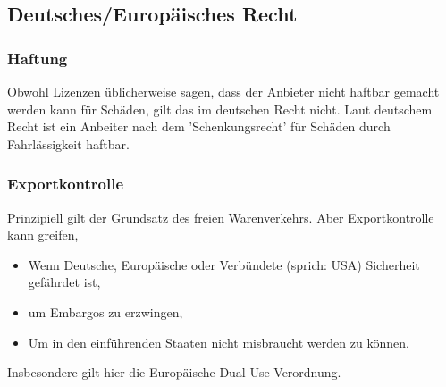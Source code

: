 \subsection{Deutsches/Europäisches Recht}

\subsubsection{Haftung}
Obwohl Lizenzen üblicherweise sagen, dass der Anbieter nicht haftbar gemacht werden kann für Schäden, gilt das im deutschen Recht nicht. Laut deutschem Recht ist ein Anbeiter nach dem 'Schenkungsrecht' für Schäden durch Fahrlässigkeit haftbar.

\subsubsection{Exportkontrolle}
Prinzipiell gilt der Grundsatz des freien Warenverkehrs. Aber Exportkontrolle kann greifen, 
\begin{itemize}
    \item Wenn Deutsche, Europäische oder Verbündete (sprich: USA) Sicherheit gefährdet ist,
    \item um Embargos zu erzwingen,
    \item Um in den einführenden Staaten nicht misbraucht werden zu können.
\end{itemize}
Insbesondere gilt hier die Europäische Dual-Use Verordnung.